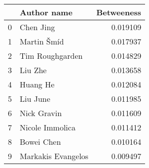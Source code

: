 \begin{tabular}{llr}
\toprule
{} &          Author name &  Betweeness \\
\midrule
0 &           Chen  Jing &    0.019109 \\
1 &          Martin Šmíd &    0.017937 \\
2 &      Tim Roughgarden &    0.014829 \\
3 &             Liu  Zhe &    0.013658 \\
4 &            Huang  He &    0.012084 \\
5 &            Liu  June &    0.011985 \\
6 &          Nick Gravin &    0.011609 \\
7 &      Nicole Immolica &    0.011412 \\
8 &           Bowei Chen &    0.010164 \\
9 &  Markakis  Evangelos &    0.009497 \\
\bottomrule
\end{tabular}
